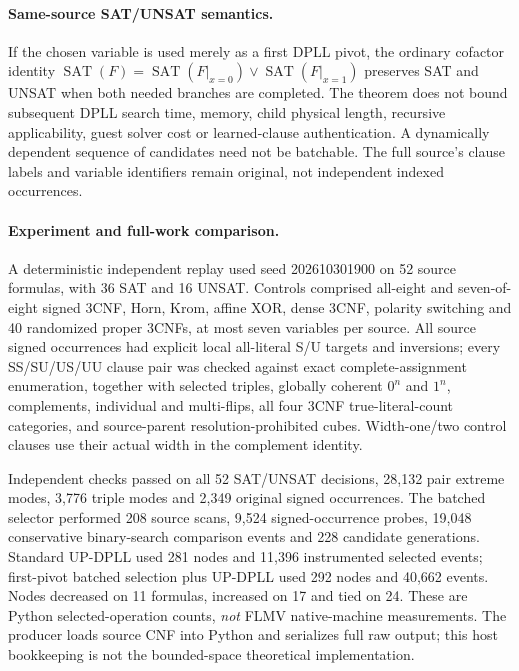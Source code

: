 \documentclass[11pt]{article}
\begin{document}
\paragraph{Same-source SAT/UNSAT semantics.}
If the chosen variable is used merely as a first DPLL pivot, the ordinary cofactor identity
$\operatorname{SAT}(F)=\operatorname{SAT}(F|_{x=0})\lor\operatorname{SAT}(F|_{x=1})$
preserves SAT and UNSAT when both needed branches are completed. The theorem does not bound subsequent DPLL search time, memory, child physical length, recursive applicability, guest solver cost or learned-clause authentication. A dynamically dependent sequence of candidates need not be batchable. The full source's clause labels and variable identifiers remain original, not independent indexed occurrences.

\paragraph{Experiment and full-work comparison.}
A deterministic independent replay used seed 202610301900 on 52 source formulas, with 36 SAT and 16 UNSAT. Controls comprised all-eight and seven-of-eight signed 3CNF, Horn, Krom, affine XOR, dense 3CNF, polarity switching and 40 randomized proper 3CNFs, at most seven variables per source. All source signed occurrences had explicit local all-literal S/U targets and inversions; every SS/SU/US/UU clause pair was checked against exact complete-assignment enumeration, together with selected triples, globally coherent $0^n$ and $1^n$, complements, individual and multi-flips, all four 3CNF true-literal-count categories, and source-parent resolution-prohibited cubes. Width-one/two control clauses use their actual width in the complement identity.

Independent checks passed on all 52 SAT/UNSAT decisions, 28,132 pair extreme modes, 3,776 triple modes and 2,349 original signed occurrences. The batched selector performed 208 source scans, 9,524 signed-occurrence probes, 19,048 conservative binary-search comparison events and 228 candidate generations. Standard UP-DPLL used 281 nodes and 11,396 instrumented selected events; first-pivot batched selection plus UP-DPLL used 292 nodes and 40,662 events. Nodes decreased on 11 formulas, increased on 17 and tied on 24. These are Python selected-operation counts, \emph{not} FLMV native-machine measurements. The producer loads source CNF into Python and serializes full raw output; this host bookkeeping is not the bounded-space theoretical implementation.
\end{document}
